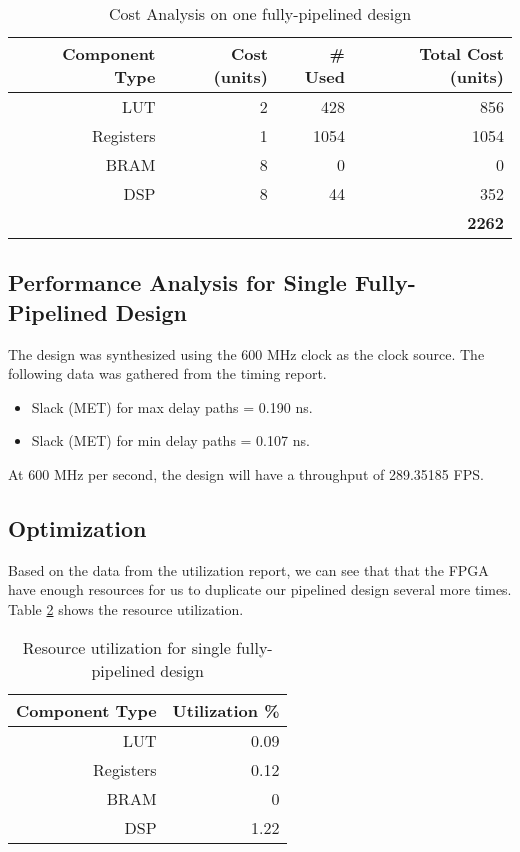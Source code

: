 \documentclass[12pt]{article}
\begin{document}
\begin{table}[htbp]
  \centering
  \caption{Cost Analysis on one fully-pipelined design}
    \begin{tabular}{rrrr}
    \toprule
    Component Type & Cost (units) & \# Used & Total Cost (units) \\
    \midrule
    LUT   & 2     & 428   & 856 \\
    Registers & 1     & 1054  & 1054 \\
    BRAM  & 8     & 0     & 0 \\
    DSP   & 8     & 44    & 352 \\
          &       &       & \textbf{2262}  \\
    \bottomrule
    \end{tabular}%
  \label{tab:oneCost}%
\end{table}%

\subsection{Performance Analysis for Single Fully-Pipelined Design}
The design was synthesized using the 600 MHz clock as the clock source. The following data was gathered from the timing report. \\

\begin{itemize}
	\item Slack (MET) for max delay paths = 0.190 ns.
	\item Slack (MET) for min delay paths = 0.107 ns.
\end{itemize}

At 600 MHz per second, the design will have a throughput of 289.35185 FPS. 


\subsection{Optimization}
Based on the data from the utilization report, we can see that that the FPGA have enough resources for us to duplicate our pipelined design several more times. Table \ref{tab:util} shows the resource utilization. 

\begin{table}[htbp]
  \centering
  \caption{Resource utilization for single fully-pipelined design }
    \begin{tabular}{rr}
    \toprule
    Component Type & Utilization \% \\
    \midrule
    LUT   & 0.09 \\
    Registers & 0.12 \\
    BRAM  & 0 \\
    DSP   & 1.22 \\
    \bottomrule
    \end{tabular}%
  \label{tab:util}%
\end{table}%
\end{document}
